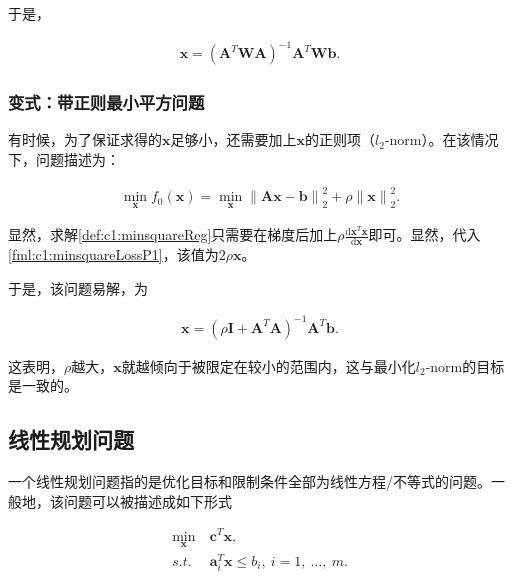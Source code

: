 于是，

\begin{equation}\label{fml:c1:minsquareReviseLossOpt}
	\begin{aligned}
		\mathbf{x} = (\mathbf{A}^T\mathbf{W}\mathbf{A})^{-1}\mathbf{A}^T\mathbf{W}\mathbf{b}.
	\end{aligned}
\end{equation}

\subsubsection{变式：带正则最小平方问题}
有时候，为了保证求得的$\mathbf{x}$足够小，还需要加上$\mathbf{x}$的正则项（$l_2$-norm）。在该情况下，问题描述为：

\begin{problem}[带正则项的最小平方问题] \label{def:c1:minsquareReg}
	\begin{align} \label{fml:c1:minsquareReg}
		\min\limits_{\mathbf{x}} f_0(\mathbf{x}) = \min\limits_{\mathbf{x}} {\lVert \mathbf{A}\mathbf{x} - \mathbf{b} \rVert}^2_2 + \rho {\lVert \mathbf{x} \rVert}^2_2.
	\end{align}
\end{problem}

显然，求解\autoref{def:c1:minsquareReg}只需要在梯度后加上$\rho\frac{\mathrm{d}\mathbf{x}^T\mathbf{x}}{\mathrm{d}\mathbf{x}}$即可。显然，代入\eqref{fml:c1:minsquareLossP1}，该值为$2\rho\mathbf{x}$。

于是，该问题易解，为

\begin{equation}\label{fml:c1:minsquareRegLossOpt}
	\begin{aligned}
		\mathbf{x} = (\rho\mathbf{I} + \mathbf{A}^T\mathbf{A})^{-1} \mathbf{A}^T\mathbf{b}.
	\end{aligned}
\end{equation}

这表明，$\rho$越大，$\mathbf{x}$就越倾向于被限定在较小的范围内，这与最小化$l_2$-norm的目标是一致的。

\subsection{线性规划问题}
\label{c1:linear}

一个线性规划问题指的是优化目标和限制条件全部为线性方程/不等式的问题。一般地，该问题可以被描述成如下形式

\begin{problem}[较一般的线性规划问题] \label{def:c1:minlinear}
	\begin{subequations}
		\renewcommand{\theequation}
		{\theparentequation-\arabic{equation}}
		\begin{align}
		\min\limits_{\mathbf{x}}~&\mathbf{c}^T\mathbf{x},\label{fml:c1:minlinear}\\ 
		s.t.~&\mathbf{a}_i^T\mathbf{x} \leqslant b_i,~i=1,~\ldots,~m. \label{fml:c1:minlinearconst}
		\end{align}
	\end{subequations}
\end{problem}

